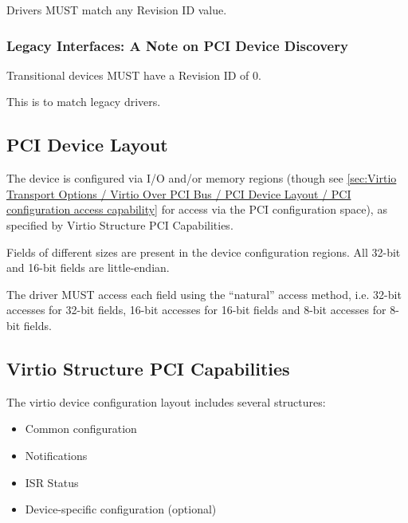 Drivers MUST match any Revision ID value. 

\subsubsection{Legacy Interfaces: A Note on PCI Device Discovery}\label{sec:Virtio Transport Options / Virtio Over PCI Bus / PCI Device Discovery / Legacy Interfaces: A Note on PCI Device Discovery}
Transitional devices MUST have a Revision ID of 0.

This is to match legacy drivers.

\subsection{PCI Device Layout}\label{sec:Virtio Transport Options / Virtio Over PCI Bus / PCI Device Layout}

The device is configured via I/O and/or memory regions (though see
\ref{sec:Virtio Transport Options / Virtio Over PCI Bus / PCI Device Layout / PCI configuration access capability}
for access via the PCI configuration space), as specified by Virtio
Structure PCI Capabilities.

Fields of different sizes are present in the device
configuration regions.
All 32-bit and 16-bit fields are little-endian.


The driver
MUST access each field using the ``natural'' access method, i.e.
32-bit accesses for 32-bit fields, 16-bit accesses for 16-bit
fields and 8-bit accesses for 8-bit fields.

\subsection{Virtio Structure PCI Capabilities}\label{sec:Virtio Transport Options / Virtio Over PCI Bus / Virtio Structure PCI Capabilities}

The virtio device configuration layout includes several structures:
\begin{itemize}
\item Common configuration
\item Notifications
\item ISR Status
\item Device-specific configuration (optional)
\end{itemize}

